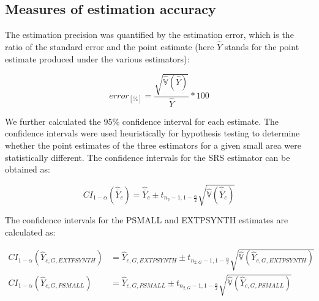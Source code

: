 \documentclass[remotesensing,article,submit,moreauthors,pdftex,10pt,a4paper]{mdpi}
\newcommand{\psmall}{PSMALL}
\newcommand{\extpsynth}{EXTPSYNTH}
\newcommand{\var}{\mathbb{V}}
\begin{document}
\subsection{Measures of estimation accuracy}

The estimation precision was quantified by the estimation error, which is the ratio of the standard error and the point estimate (here $\hat{Y}$ stands for the point estimate produced under the various estimators):

\begin{equation}\label{eq:error}
error_{[\%]}=\frac{\sqrt{\hat{\var}(\hat{Y})}}{\hat{Y}}*100
\end{equation}

We further calculated the 95\% confidence interval for each estimate. The confidence intervals were used heuristically for hypothesis testing to determine whether the point estimates of the three estimators for a given small area were statistically different. The confidence intervals for the SRS estimator can be obtained as:


\begin{equation}\label{ci_1phase}
CI_{1-\alpha}(\hat{\bar{Y}}_c)=\hat{\bar{Y}}_c \pm t_{n_{2}-1, 1-\frac{\alpha}{2}}\sqrt{\hat{\var}(\hat{\bar{Y}}_c)}
\end{equation}


The confidence intervals for the \psmall{} and \extpsynth{} estimates are calculated as:


\begin{subequations}\label{ci_2phase_sae}
	\begin{align}
	CI_{1-\alpha}(\hat{Y}_{c,G,EXTPSYNTH})&=\hat{Y}_{c,G,EXTPSYNTH} \pm t_{n_{2,G}-1, 1-\frac{\alpha}{2}}\sqrt{\hat{\var}(\hat{Y}_{c,G,EXTPSYNTH})} \\
	CI_{1-\alpha}(\hat{Y}_{c,G,PSMALL})&=\hat{Y}_{c,G,PSMALL} \pm t_{n_{2,G}-1, 1-\frac{\alpha}{2}}\sqrt{\hat{\var}(\hat{Y}_{c,G,PSMALL})}
	\end{align}
\end{subequations}
\end{document}
